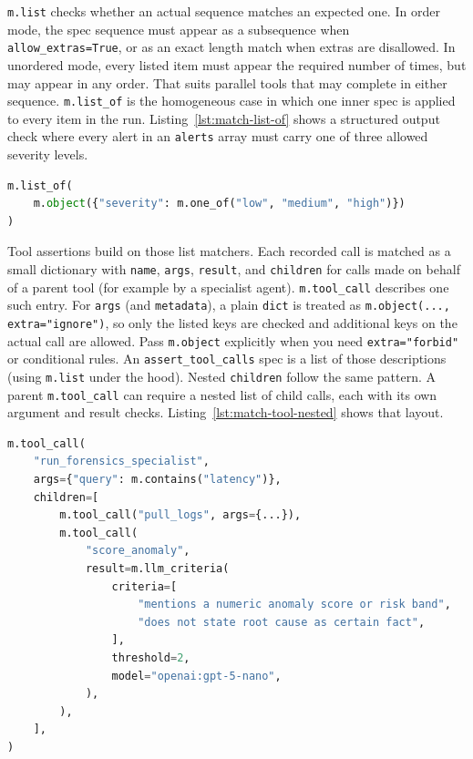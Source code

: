 \texttt{m.list} checks whether an actual sequence matches an expected one. In order mode, the spec sequence must appear as a subsequence when \texttt{allow\_extras=True}, or as an exact length match when extras are disallowed. In unordered mode, every listed item must appear the required number of times, but may appear in any order. That suits parallel tools that may complete in either sequence. \texttt{m.list\_of} is the homogeneous case in which one inner spec is applied to every item in the run. Listing~\ref{lst:match-list-of} shows a structured output check where every alert in an \texttt{alerts} array must carry one of three allowed severity levels.

\begin{lstlisting}[language=Python,caption={\texttt{m.list\_of}: every item in the list must satisfy the same inner spec (here, each alert object must have \texttt{severity} set to \texttt{low}, \texttt{medium}, or \texttt{high}).},label=lst:match-list-of]
m.list_of(
    m.object({"severity": m.one_of("low", "medium", "high")})
)
\end{lstlisting}

Tool assertions build on those list matchers. Each recorded call is matched as a small dictionary with \texttt{name}, \texttt{args}, \texttt{result}, and \texttt{children} for calls made on behalf of a parent tool (for example by a specialist agent). \texttt{m.tool\_call} describes one such entry. For \texttt{args} (and \texttt{metadata}), a plain \texttt{dict} is treated as \texttt{m.object(..., extra="ignore")}, so only the listed keys are checked and additional keys on the actual call are allowed. Pass \texttt{m.object} explicitly when you need \texttt{extra="forbid"} or conditional rules. An \texttt{assert\_tool\_calls} spec is a list of those descriptions (using \texttt{m.list} under the hood). Nested \texttt{children} follow the same pattern. A parent \texttt{m.tool\_call} can require a nested list of child calls, each with its own argument and result checks. Listing~\ref{lst:match-tool-nested} shows that layout.

\begin{lstlisting}[language=Python,caption={Nested tool-call spec with child tools.},label=lst:match-tool-nested]
m.tool_call(
    "run_forensics_specialist",
    args={"query": m.contains("latency")},
    children=[
        m.tool_call("pull_logs", args={...}),
        m.tool_call(
            "score_anomaly",
            result=m.llm_criteria(
                criteria=[
                    "mentions a numeric anomaly score or risk band",
                    "does not state root cause as certain fact",
                ],
                threshold=2,
                model="openai:gpt-5-nano",
            ),
        ),
    ],
)
\end{lstlisting}

